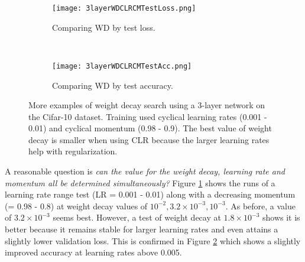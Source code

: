 \documentclass{article} %
\begin{document}
\begin{figure}[tbh]
	\centering
	\begin{subfigure}[b]{0.5\textwidth}
		\texttt{[image: 3layerWDCLRCMTestLoss.png]}
		\caption{Comparing WD by test loss.}
		\label{fig:3layerWDCLRCMTestLoss}       %
	\end{subfigure}
	\quad
	\hfill
	~ %
	\centering
	\begin{subfigure}[b]{0.43\textwidth}
		\texttt{[image: 3layerWDCLRCMTestAcc.png]}
		\caption{Comparing WD by test accuracy.}
		\label{fig:3layerWDCLRCMTestAcc}       %
	\end{subfigure}
	\caption{More examples of weight decay search using a 3-layer network on the Cifar-10 dataset. Training used cyclical learning rates (0.001 - 0.01) and cyclical momentum (0.98 - 0.9). The best value of weight decay is smaller when using CLR because the larger learning rates help with regularization.}
	\label{fig:3layerWD2}
	\vspace{-5pt}	
\end{figure}

A reasonable question is \emph{can the value for the weight decay, learning rate and momentum all be determined simultaneously?} Figure \ref{fig:3layerWDCLRCMTestLoss} shows the runs of a learning rate range test (LR = 0.001 - 0.01) along with a decreasing momentum (= 0.98 - 0.8) at weight decay values of $ 10^{-2}, 3.2 \times  10^{-3}, 10^{-3}$.  As before, a value of $3.2 \times  10^{-3}$ seems best.  However, a test of weight decay at $1.8 \times  10^{-3}$ shows it is better  because it remains stable for larger learning rates and even attains a slightly lower validation loss.  This is confirmed in Figure \ref{fig:3layerWDCLRCMTestAcc} which shows a slightly improved accuracy at learning rates above 0.005.

\end{document}
